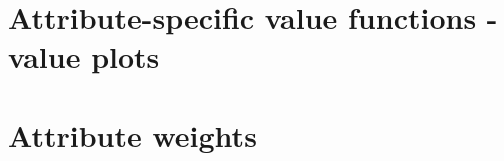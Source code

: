 \documentclass{article}
\begin{document}
\section{Attribute-specific value functions - value plots}
\section{Attribute weights}
\begin{comment} v_9 derivation
\begin{equation}
	B+A(1-e^{-(3-x_9)/r}) \text{ and } v_9(0)-v_9(1) = v_9(1) - v_9(3)
\end{equation}

\begin{align}
	&B+A(1-e^{-(3-x_9)/r})\\ 
	v_9(3) = 0 =& B+A(1-e^{-(3-3)/r}) \iff B= 0 \\
	v_9(0) = 1 =& A(1-e^{-(3-0)/r}) \\
	& \frac{1}{A}= 1 - e^{-3/r} \\
	& A= \frac{1}{1-u^3} \\
\end{align}
\begin{align}
	v_9(100)= 0 =& A(1-e^{-(3-100)/r})\\
\end{align}
\begin{align}
	v_9(0)-v_9(1) &= v_9(1) - v_9(3)\\
	2v_9(1) &= v_9(0)\\
	v_9(1) &= \frac{1}{2}\\
	\frac{1}{2} &= \frac{1}{1-u^3}(1-u^{2})\\
	1-u^3 &= 2-2u^2\\
	-u^3 + 2u^2 - 1 &= 0 \implies  u=\frac{1}{2}+\frac{\sqrt{5}}{2} \left(\lor u=1 \lor u=\frac{1}{2}-\frac{\sqrt{5}}{2}\right) \\
	e^{-1/r} &= 	\frac{1}{2}+\frac{\sqrt{5}}{2} \iff r = \frac{1}{ln(2) - ln(1 + sqrt(5))}	\\
	\implies A&= \frac{1}{1-( 1/2 + sqrt(5)/2)} \iff A= \frac{1}{4}(1-\sqrt{5}) \\
	\implies v_9&= \frac{1}{4}(1-\sqrt{5})\left(1-\left(\frac{1}{2}\left(1+\sqrt{5}\right)^{-(3-x_9)}\right)\right)
\end{align}
\end{comment}
\end{document}
